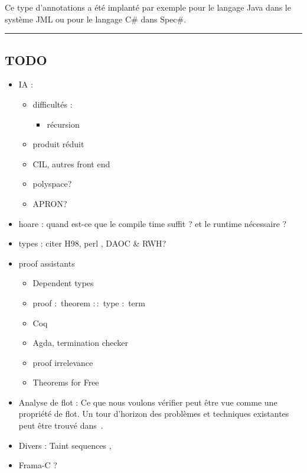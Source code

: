 Ce type d'annotations a été implanté par exemple pour le langage Java dans le
système JML\cite{jmlkluwer} ou pour le langage C\# dans Spec\#\cite{krml136}.

\begin{center}\rule{3in}{0.4pt}\end{center}

\clearpage

\subsection*{TODO}

\begin{itemize}
\item IA :
\begin{itemize}
\item difficultés :

\begin{itemize}
\item
  récursion
\end{itemize}

\item produit réduit
\item CIL, autres front end
\item polyspace?
\item APRON?
\end{itemize}

\item
  hoare : quand est-ce que le compile time suffit ? et le runtime nécessaire ?
\item
  types : citer H98\cite{haskell98}, perl \cite{perlCamelBook}, DAOC\cite{DAOC}
  \& RWH\cite{rwh}?
\item proof assistants
  \begin{itemize}
  \item Dependent types
  \item proof $:$ theorem $::$ type $:$ term
  \item Coq
  \item Agda, termination checker
  \item proof irrelevance
  \item Theorems for Free\cite{theoremsforfree}
  \end{itemize}

\item
  Analyse de flot :
Ce que nous voulons vérifier peut être vue comme une propriété de flot. Un tour
d'horizon des problèmes et techniques existantes peut être trouvé
dans~\cite{sm-jsac03}.

\item Divers : Taint sequences \cite{mdv10},
\item Frama-C ?
\end{itemize}

